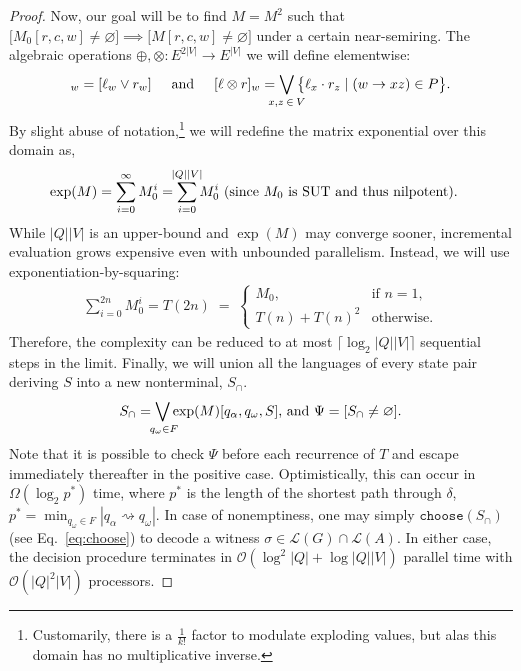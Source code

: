 \documentclass[sigplan,acmsmall,nonacm,screen]{acmart}\settopmatter{printfolios=false,printccs=false,printacmref=false}
\begin{document}
\begin{proof}[Proof]
  Now, our goal will be to find $M=M^2$ such that $\big[M_0[r, c, w] \neq \varnothing\big] \implies \big[M[r, c, w] \neq \varnothing\big]$ under a certain near-semiring. The algebraic operations $\oplus, \otimes: E^{2|V|} \rightarrow E^{|V|}$ we will define elementwise:
  \begin{equation}
    [\ell \oplus r]_w  = [\ell_w \lor r_w]\hspace{0.5cm}\text{and}\hspace{0.5cm}
    [\ell \otimes r]_w = \bigvee_{\mathclap{x, z\:\in\:V}}\big\{\ell_x \cdot r_z \mid (w \rightarrow xz) \in P\big\}.
  \end{equation}
  By slight abuse of notation,\footnote{Customarily, there is a $\frac{1}{k!}$ factor to modulate exploding values, but alas this domain has no multiplicative inverse.} we will redefine the matrix exponential over this domain as,
  \begin{align}
    \exp(M) &= \sum_{i = 0}^\infty M_0^i = \sum_{i = 0}^{\mathclap{|Q||V|}} M_0^i \text { (since $M_0$ is SUT and thus nilpotent).}
  \end{align}
  While $|Q||V|$ is an upper-bound and $\exp(M)$ may converge sooner, incremental evaluation grows expensive even with unbounded parallelism. Instead, we will use exponentiation-by-squaring:
  \begin{align}
    \sum_{i = 0}^{2n} M_0^i = T(2n) \;=\; \begin{cases}
       M_0, & \text{if } n = 1,\\
       T(n) + T(n)^2 & \text{otherwise}.
    \end{cases}
  \end{align}
  Therefore, the complexity can be reduced to at most $\lceil\log_2 |Q||V|\rceil$ sequential steps in the limit. Finally, we will union all the languages of every state pair deriving $S$ into a new nonterminal, $S_\cap$.
  \begin{align}
    S_\cap = \bigvee_{\mathclap{\:q_\omega \in F}}\exp(M)[q_\alpha, q_\omega, S] \text{, and } \Psi = [S_\cap \neq \varnothing].
  \end{align}
  Note that it is possible to check $\Psi$ before each recurrence of $T$ and escape immediately thereafter in the positive case. Optimistically, this can occur in $\Omega(\log_2 p^*)$ time, where $p^*$ is the length of the shortest path through $\delta$, $p^*=\min_{q_\omega \in F}|q_\alpha\rightsquigarrow q_\omega|$. In case of nonemptiness, one may simply $\texttt{choose}(S_\cap)$ (see Eq.~\ref{eq:choose}) to decode a witness $\sigma \in \mathcal{L}(G)\cap\mathcal{L}(A)$. In either case, the decision procedure terminates in $\mathcal{O}(\log^2 |Q| + \log |Q||V|)$ parallel time with $\mathcal{O}(|Q|^2|V|)$ processors.
\end{proof}\clearpage
\end{document}
